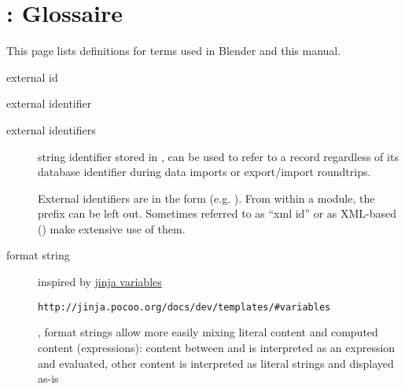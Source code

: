 \documentclass[a4paper,10pt,french]{sphinxmanual}
\begin{document}
\chapter{ : Glossaire}
\label{\detokenize{docs/refs/autocad-gloss::doc}}\label{\detokenize{docs/refs/autocad-gloss:autodesk}}\label{\detokenize{docs/refs/autocad-gloss:acad-glossaire}}\label{\detokenize{docs/refs/autocad-gloss:autocad-gloss}}
This page lists definitions for terms used in Blender and this manual.
\begin{description}
\item[{external id}] \leavevmode{}\label{\detokenize{docs/refs/autocad-gloss:term-external-id}}\item[{external identifier}] \leavevmode{}\label{\detokenize{docs/refs/autocad-gloss:term-external-identifier}}\item[{external identifiers}] \leavevmode{}\label{\detokenize{docs/refs/autocad-gloss:term-external-identifiers}}
string identifier stored in , can be used to refer to a record regardless of its database identifier during data imports or export/import roundtrips.

External identifiers are in the form  (e.g. ). From within a module, the  prefix can be left out.
Sometimes referred to as ``xml id'' or  as XML-based {\hyperref[\detokenize{docs/refs/autocad-faq:autocad-faq}]{}} () make extensive use of them.

\item[{format string}] \leavevmode{}\label{\detokenize{docs/refs/autocad-gloss:term-format-string}}
inspired by \href{http://jinja.pocoo.org/docs/dev/templates/\#variables}{jinja variables}%
\begin{footnote}[3]\sphinxAtStartFootnote
\nolinkurl{http://jinja.pocoo.org/docs/dev/templates/\#variables}
%
\end{footnote}, format strings allow more easily mixing literal content and computed content (expressions): content between \sphinxcode{\{\{} and \sphinxcode{\}\}} is interpreted as an expression and evaluated, other content is interpreted as literal strings and displayed as-is


\end{description}
\end{document}
